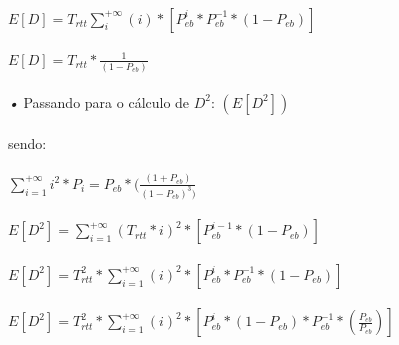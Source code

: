 \documentclass[13pt,a4paper]{report}
\begin{document}
\paragraph{}
$E[D] = T_{rtt} \sum\limits_{i}^{+\infty} (i) * [ P_{eb}^i * P_{eb}^{-1} * (1 - P_{eb})]$

\paragraph{}
$E[D] = T_{rtt} * \frac{1}{(1 - P_{eb})}$

\paragraph{}
\paragraph{}
\emph{•} Passando para o cálculo de $D^2$: $(E[D^2])$

\paragraph{}
sendo:
\paragraph{} 
$\sum\limits_{i=1}^{+\infty} i^2 * P_{i} = P_{eb} * (\frac{(1 + P_{eb})}{(1-P_{eb})^3)}$

\paragraph{}
\paragraph{}
$E[D^2] = \sum\limits_{i=1}^{+\infty} (T_{rtt} * i)^2 * [P_{eb}^{i-1} * (1 - P_{eb})]$

\paragraph{}
$E[D^2] = T_{rtt}^2 * \sum\limits_{i=1}^{+\infty} (i)^2 * [P_{eb}^{i} * P_{eb}^{-1} * (1 - P_{eb})]$

\paragraph{}
$E[D^2] = T_{rtt}^2 * \sum\limits_{i=1}^{+\infty} (i)^2 * [P_{eb}^{i} * (1 - P_{eb}) * P_{eb}^{-1} * (\frac{P_{eb}}{P_{eb}})]$
\end{document}
